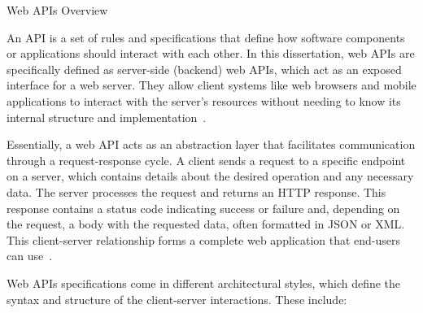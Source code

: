 \documentclass[12pt,reqno, oneside]{amsbook}
\makeatletter
\def\section{\@startsection{section}{1}%
      \z@{.5\linespacing\@plus.7\linespacing}{.25\linespacing}%
      {\normalfont\bfseries\flushleft}}
\theoremstyle{definition}
\theoremstyle{definition}
\numberwithin{section}{chapter}
\numberwithin{table}{chapter}
\numberwithin{figure}{chapter}
\makeatother
\begin{document}
\section{Web \texorpdfstring{\acp{API}}{API} Overview}
\label{Section:Web_API_Overview}

An \ac{API} is a set of rules and specifications that define how software components or applications should interact with each other. In this dissertation, web \acp{API} are specifically defined as server-side (backend) web \acp{API}, which act as an exposed interface for a web server. They allow client systems like web browsers and mobile applications to interact with the server's resources without needing to know its internal structure and implementation~\cite{Jin2018,Neumann2021, Khozaimi2022}.

Essentially, a web \ac{API} acts as an abstraction layer that facilitates communication through a request-response cycle. A client sends a request to a specific endpoint on a server, which contains details about the desired operation and any necessary data. The server processes the request and returns an \ac{HTTP} response. This response contains a status code indicating success or failure and, depending on the request, a body with the requested data, often formatted in \ac{JSON} or \ac{XML}. This client-server relationship forms a complete web application that end-users can use~\cite{Jin2018,Neumann2021, Khozaimi2022}.

Web \acp{API} specifications come in different architectural styles, which define the syntax and structure of the client-server interactions. These include:
\end{document}
